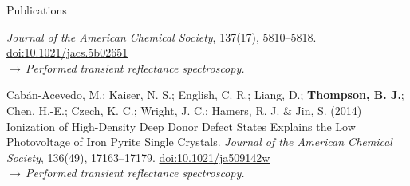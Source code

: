 \documentclass{resume}  %
\begin{document}
\begin{rSection}{Publications}
\begin{etaremune}[leftmargin = 1.75em]
      \textit{Journal of the American Chemical Society}, 137(17), 5810–5818.
      \href{https://doi.org/10.1021/jacs.5b02651}{doi:10.1021/jacs.5b02651} \\
      $\rightarrow\,$\textit{Performed transient reflectance spectroscopy.}
    \item Cabán-Acevedo, M.; Kaiser, N. S.; English, C. R.; Liang, D.; \textbf{Thompson, B. J.};
      Chen, H.-E.; Czech, K. C.; Wright, J. C.; Hamers, R. J. \& Jin, S.
      (2014)
      Ionization of High-Density Deep Donor Defect States Explains the Low
      Photovoltage of Iron Pyrite Single Crystals.
      \textit{Journal of the American Chemical Society}, 136(49), 17163–17179.
      \href{https://doi.org/10.1021/ja509142w}{doi:10.1021/ja509142w} \\
      $\rightarrow\,$\textit{Performed transient reflectance spectroscopy.}
  \end{etaremune}
\end{rSection}

\clearpage
\end{document}
